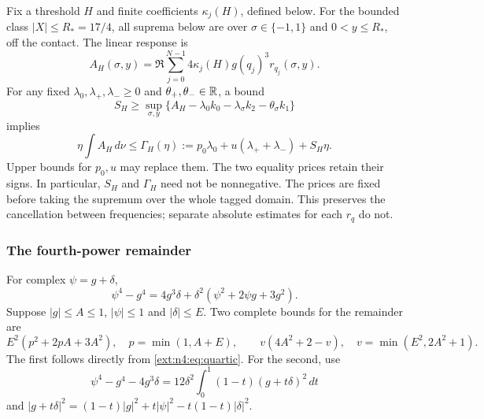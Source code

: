 Fix a threshold $H$ and finite coefficients $\kappa_j(H)$, defined
below. For the bounded class $|X|\le R_*=17/4$, all suprema below
are over $\sigma\in\{-1,1\}$ and $0<y\le R_*$, off the contact.
The linear response is
\[
 A_H(\sigma,y)=\Re\sum_{j=0}^{N-1}
        4\kappa_j(H)g(q_j)^3r_{q_j}(\sigma,y).
\]
For any fixed $\lambda_0,\lambda_+,\lambda_-\ge0$ and
$\theta_+,\theta_-\in\mathbb R$, a bound
\begin{equation}\label{ext:n4:eq:priced-supremum}
 S_H\ge\sup_{\sigma,y}
 \{A_H-\lambda_0k_0-\lambda_\sigma k_2-\theta_\sigma k_1\}
\end{equation}
implies
\begin{equation}\label{ext:n4:eq:gamma}
 \eta\int A_H\,d\nu\le
 \Gamma_H(\eta):=p_0\lambda_0+u(\lambda_++\lambda_-)+S_H\eta.
\end{equation}
Upper bounds for $p_0,u$ may replace them. The two equality prices
retain their signs. In particular, $S_H$ and $\Gamma_H$ need not be
nonnegative. The prices are fixed before taking the supremum over
the whole tagged domain. This preserves the cancellation between
frequencies; separate absolute estimates for each $r_q$ do not.

\subsubsection{The fourth-power remainder}
For complex $\psi=g+\delta$,
\begin{equation}\label{ext:n4:eq:quartic}
 \psi^4-g^4=4g^3\delta+
 \delta^2(\psi^2+2\psi g+3g^2).
\end{equation}
Suppose $|g|\le A\le1$, $|\psi|\le1$ and $|\delta|\le E$.
Two complete bounds for the remainder are
\begin{equation}\label{ext:n4:eq:quartic-basic}
 E^2(p^2+2pA+3A^2),\quad p=\min(1,A+E),\qquad
 v(4A^2+2-v),\quad v=\min(E^2,2A^2+1).
\end{equation}
The first follows directly from \eqref{ext:n4:eq:quartic}. For the
second, use
\[
 \psi^4-g^4-4g^3\delta
   =12\delta^2\int_0^1(1-t)(g+t\delta)^2\,dt
\]
and
$|g+t\delta|^2=(1-t)|g|^2+t|\psi|^2-t(1-t)|\delta|^2$.

